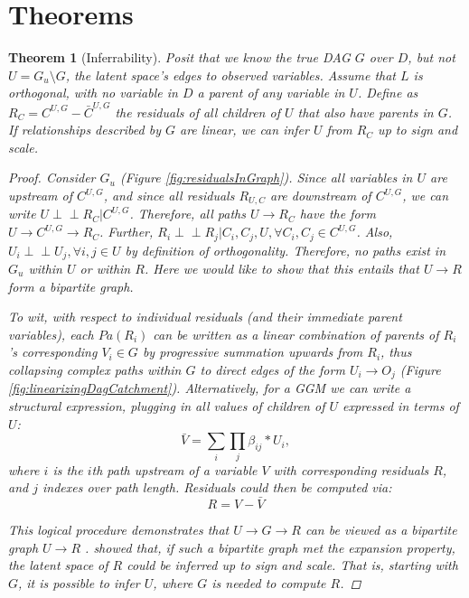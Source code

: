 \documentclass{article}
\newtheorem{theorem}{Theorem}
\begin{document}
\section{Theorems}
\begin{theorem}[Inferrability]
\label{thm:inferrability}
Posit that we know the true DAG $G$ over $D$, but not $U = G_u \setminus G$, the latent space's edges to observed variables.  Assume that $L$ is orthogonal, with no variable in $D$ a parent of any variable in $U$. Define as $R_C = C^{U,G} - \bar{C}^{U,G}$ the residuals of all children of $U$ that also have parents in $G$.  If relationships described by $G$ are linear, we can infer $U$ from $R_C$ up to sign and scale.  

\begin{proof}
Consider $G_u$ (Figure \ref{fig:residualsInGraph}).  Since all
variables in $U$ are upstream of $C^{U,G}$, and since all residuals
$R_{U,C}$ are downstream of $C^{U,G}$, we can write $U
\perp\!\!\!\perp R_C | C^{U,G}$.  Therefore, all paths $U \rightarrow
R_C$ have the form $U \rightarrow C^{U,G} \rightarrow R_C$.  Further,
$R_i \perp\!\!\!\perp R_j | C_i,C_j,U,   \forall C_i, C_j \in
C^{U,G}$. Also, $U_i \perp\!\!\!\perp U_j, \forall i, j \in U$ by
definition of orthogonality.  Therefore, no paths exist in $G_u$
within $U$ or within $R$.  Here we would like to show that this
entails that $U\rightarrow R$ form a bipartite graph.

To wit, with respect to individual residuals (and their immediate parent variables), each $Pa(R_i)$ can be written as a linear combination of parents of $R_i$'s corresponding $V_i \in G$ by progressive summation upwards from $R_i$, thus collapsing complex paths within $G$ to direct edges of the form $U_i \rightarrow O_j$ (Figure \ref{fig:linearizingDagCatchment}).  Alternatively, for a GGM we can write a structural expression, plugging in all values of children of $U$ expressed in terms of $U$:
\begin{equation}
\label{eq:bipartiteRepresentation}
\bar{V} = \sum_i \prod_j \beta_{ij}*U_i,
\end{equation} where $i$ is the $i$th path upstream of a variable $V$ with corresponding residuals $R$, and $j$ indexes over path length.  Residuals could then be computed via:
\begin{equation}
R = V - \bar{V}
\end{equation}

This logical procedure demonstrates that $U\rightarrow G\rightarrow R$
can be viewed as a bipartite graph $U\rightarrow R$ .  \cite{anandkumar_learning_2013} showed that, if such a bipartite graph met the expansion property, the latent space of $R$ could be inferred up to sign and scale.  That is, starting with $G$, it is possible to infer $U$, where $G$ is needed to compute $R$.  


\end{proof}
\end{theorem}
\end{document}
